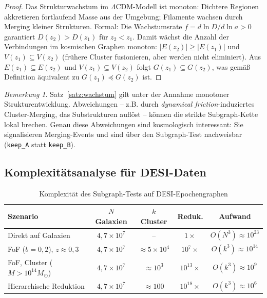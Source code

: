 ﻿\documentclass[a4paper,12pt]{article}
\theoremstyle{definition}
\theoremstyle{remark}
\newtheorem{bemerkung}{Bemerkung}[section]
\begin{document}
\begin{proof}
  Das Strukturwachstum im $\Lambda$CDM-Modell ist monoton: Dichtere Regionen
  akkretieren fortlaufend Masse aus der Umgebung; Filamente wachsen durch
  Merging kleiner Strukturen. Formal: Die Wachstumsrate $f = d\ln D/d\ln a > 0$
  garantiert $D(z_2) > D(z_1)$ für $z_2 < z_1$. Damit wächst die Anzahl der
  Verbindungen im kosmischen Graphen monoton:
  $|E(z_2)| \geq |E(z_1)|$ und $V(z_1) \subseteq V(z_2)$ (frühere Cluster
  fusionieren, aber werden nicht eliminiert). Aus $E(z_1) \subseteq E(z_2)$
  und $V(z_1) \subseteq V(z_2)$ folgt $G(z_1) \subseteq G(z_2)$, was
  gemäß Definition äquivalent zu $G(z_1) \preceq G(z_2)$ ist.
\end{proof}

\begin{bemerkung}
  Satz~\ref{satz:wachstum} gilt unter der Annahme monotoner Strukturentwicklung.
  Abweichungen -- z.B. durch \textit{dynamical friction}-induziertes
  Cluster-Merging, das Substrukturen auflöst -- können die strikte
  Subgraph-Kette lokal brechen. Genau diese Abweichungen sind
  kosmologisch interessant: Sie signalisieren Merging-Events und sind
  über den Subgraph-Test nachweisbar (\texttt{keep\_A} statt
  \texttt{keep\_B}).
\end{bemerkung}

\subsection{Komplexitätsanalyse für DESI-Daten}

\begin{table}[H]
  \centering
  \caption{Komplexität des Subgraph-Tests auf DESI-Epochengraphen}
  \label{tab:complexity}
  \begin{tabular}{lcccc}
    \toprule
    \textbf{Szenario} & \textbf{$N$ Galaxien} & \textbf{$k$ Cluster} & \textbf{Reduk.} & \textbf{Aufwand} \\
    \midrule
    Direkt auf Galaxien & $4{,}7\times10^7$ & -- & $1\times$ & $O(N^3) \approx 10^{23}$ \\
    FoF ($b=0{,}2$), $z\approx0{,}3$ & $4{,}7\times10^7$ & $\approx 5\times10^4$ & $10^7\times$ & $O(k^3) \approx 10^{14}$ \\
    FoF, Cluster ($M>10^{14}M_\odot$) & $4{,}7\times10^7$ & $\approx 10^3$ & $10^{13}\times$ & $O(k^3) \approx 10^9$ \\
    Hierarchische Reduktion & $4{,}7\times10^7$ & $\approx 100$ & $10^{18}\times$ & $O(k^3) \approx 10^6$ \\
    \bottomrule
  \end{tabular}
\end{table}
\end{document}
